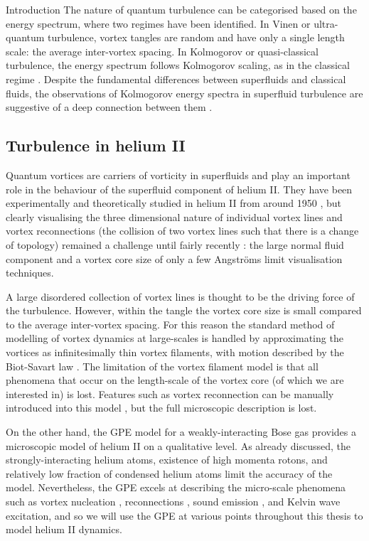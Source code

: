 \begin{chapter}{\label{cha:bose_gases}Introduction}
The nature of quantum turbulence can be categorised based on the energy spectrum, where two regimes have been identified. In Vinen or ultra-quantum turbulence, vortex tangles are random and have only a single length scale: the average inter-vortex spacing. In Kolmogorov or quasi-classical turbulence, the energy spectrum follows Kolmogorov scaling, as in the classical regime \cite{Nore,Kobayashi,PhysRevLett.103.084501}. Despite the fundamental differences between superfluids and classical fluids, the observations of Kolmogorov energy spectra in superfluid turbulence are suggestive of a deep connection between them \cite{barenghi_skrbek_14}. 

\subsection{Turbulence in helium II}
Quantum vortices are carriers of vorticity in superfluids and play an important role in the behaviour of the superfluid component of helium II. They have been experimentally and theoretically studied in helium II from around 1950 \cite{Donnelly}, but clearly visualising the three dimensional nature of individual vortex lines and vortex reconnections (the collision of two vortex lines such that there is a change of topology) remained a challenge until fairly recently \cite{Bewley09,Fonda12}: the large normal fluid component and a vortex core size of only a few Angstr\"oms limit visualisation techniques.

A large disordered collection of vortex lines is thought to be the driving force of the turbulence. However, within the tangle the vortex core size is small compared to the average inter-vortex spacing. For this reason the standard method of modelling of vortex dynamics at large-scales is handled by approximating the vortices as infinitesimally thin vortex filaments, with motion described by the Biot-Savart law \cite{barenghi_donnelly_01}. The limitation of the vortex filament model is that all phenomena that occur on the length-scale of the vortex core (of which we are interested in) is lost. Features such as vortex reconnection can be manually introduced into this model \cite{barenghi_donnelly_01}, but the full microscopic description is lost.

On the other hand, the GPE model for a weakly-interacting Bose gas provides a microscopic model of helium II on a qualitative level. As already discussed, the strongly-interacting helium atoms, existence of high momenta rotons, and relatively low fraction of condensed helium atoms limit the accuracy of the model. Nevertheless, the GPE excels at describing the micro-scale phenomena such as vortex nucleation \cite{frisch92}, reconnections \cite{PhysRevLett.71.1375, PhysRevLett.76.4745}, sound emission \cite{leadbeater,PhysRevA.69.053601}, and Kelvin wave excitation, and so we will use the GPE at various points throughout this thesis to model helium II dynamics.


\end{chapter}
